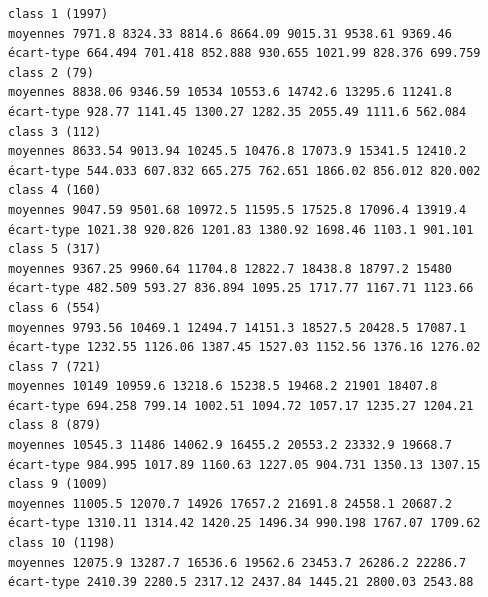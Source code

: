 \documentclass[land,article,submit,pdftex,moreauthors]{Definitions/mdpi}
\begin{document}
\begin{scriptsize}
\begin{verbatim}
class 1 (1997)
moyennes 7971.8 8324.33 8814.6 8664.09 9015.31 9538.61 9369.46
écart-type 664.494 701.418 852.888 930.655 1021.99 828.376 699.759
class 2 (79)
moyennes 8838.06 9346.59 10534 10553.6 14742.6 13295.6 11241.8
écart-type 928.77 1141.45 1300.27 1282.35 2055.49 1111.6 562.084
class 3 (112)
moyennes 8633.54 9013.94 10245.5 10476.8 17073.9 15341.5 12410.2
écart-type 544.033 607.832 665.275 762.651 1866.02 856.012 820.002
class 4 (160)
moyennes 9047.59 9501.68 10972.5 11595.5 17525.8 17096.4 13919.4
écart-type 1021.38 920.826 1201.83 1380.92 1698.46 1103.1 901.101
class 5 (317)
moyennes 9367.25 9960.64 11704.8 12822.7 18438.8 18797.2 15480
écart-type 482.509 593.27 836.894 1095.25 1717.77 1167.71 1123.66
class 6 (554)
moyennes 9793.56 10469.1 12494.7 14151.3 18527.5 20428.5 17087.1
écart-type 1232.55 1126.06 1387.45 1527.03 1152.56 1376.16 1276.02
class 7 (721)
moyennes 10149 10959.6 13218.6 15238.5 19468.2 21901 18407.8
écart-type 694.258 799.14 1002.51 1094.72 1057.17 1235.27 1204.21
class 8 (879)
moyennes 10545.3 11486 14062.9 16455.2 20553.2 23332.9 19668.7
écart-type 984.995 1017.89 1160.63 1227.05 904.731 1350.13 1307.15
class 9 (1009)
moyennes 11005.5 12070.7 14926 17657.2 21691.8 24558.1 20687.2
écart-type 1310.11 1314.42 1420.25 1496.34 990.198 1767.07 1709.62
class 10 (1198)
moyennes 12075.9 13287.7 16536.6 19562.6 23453.7 26286.2 22286.7
écart-type 2410.39 2280.5 2317.12 2437.84 1445.21 2800.03 2543.88


\end{verbatim}
\end{scriptsize}
\end{document}
